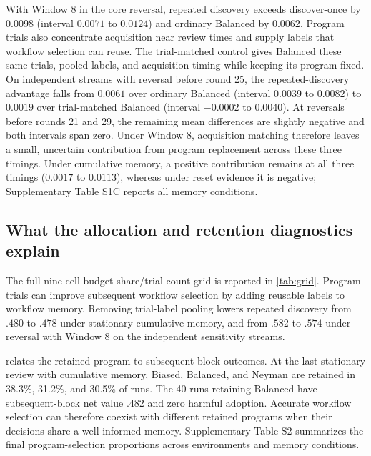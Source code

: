 With Window 8 in the core reversal, repeated discovery exceeds discover-once by $0.0098$ (interval $0.0071$ to $0.0124$) and ordinary Balanced by $0.0062$. Program trials also concentrate acquisition near review times and supply labels that workflow selection can reuse. The trial-matched control gives Balanced these same trials, pooled labels, and acquisition timing while keeping its program fixed. On independent streams with reversal before round 25, the repeated-discovery advantage falls from $0.0061$ over ordinary Balanced (interval $0.0039$ to $0.0082$) to $0.0019$ over trial-matched Balanced (interval $-0.0002$ to $0.0040$). At reversals before rounds 21 and 29, the remaining mean differences are slightly negative and both intervals span zero. Under Window 8, acquisition matching therefore leaves a small, uncertain contribution from program replacement across these three timings. Under cumulative memory, a positive contribution remains at all three timings ($0.0017$ to $0.0113$), whereas under reset evidence it is negative; Supplementary Table S1C reports all memory conditions.

\subsection{What the allocation and retention diagnostics explain}
The full nine-cell budget-share/trial-count grid is reported in \cref{tab:grid}. Program trials can improve subsequent workflow selection by adding reusable labels to workflow memory. Removing trial-label pooling lowers repeated discovery from $.480$ to $.478$ under stationary cumulative memory, and from $.582$ to $.574$ under reversal with Window 8 on the independent sensitivity streams.

 relates the retained program to subsequent-block outcomes. At the last stationary review with cumulative memory, Biased, Balanced, and Neyman are retained in 38.3\%, 31.2\%, and 30.5\% of runs. The 40 runs retaining Balanced have subsequent-block net value $.482$ and zero harmful adoption. Accurate workflow selection can therefore coexist with different retained programs when their decisions share a well-informed memory. Supplementary Table S2 summarizes the final program-selection proportions across environments and memory conditions.
